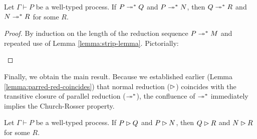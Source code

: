 \begin{lemma} \label{lemma:parred-star-diamond}
  Let $\Gamma \vdash P$ be a well-typed process.
  If $P \twoheadrightarrow^* Q$ and $P \twoheadrightarrow^* N$, then $Q \twoheadrightarrow^* R$ and $N \twoheadrightarrow^* R$ for some $R$.
\end{lemma}
\begin{proof}
  By induction on the length of the reduction sequence $P \twoheadrightarrow^* M$
  and repeated use of Lemma \ref{lemma:strip-lemma}. Pictorially:
  \begin{center}
\end{center}
\end{proof}

Finally, we obtain the main result.
Because we established earlier (Lemma \ref{lemma:parred-red-coincides}) that
normal reduction ($\rhd$) coincides with the transitive closure of parallel reduction ($\twoheadrightarrow^*$),
the confluence of $\twoheadrightarrow^*$ immediately implies the Church-Rosser property.

\begin{theorem} \label{theorem:church-rosser}
  Let $\Gamma \vdash P$ be a well-typed process.
  If $P \rhd Q$ and $P \rhd N$, then $Q \rhd R$ and $N \rhd R$ for some $R$.
\end{theorem}
